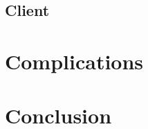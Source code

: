 \documentclass[10pt,a4paper]{article}
\begin{document}
\subsection{Client}


\section{Complications}
\label{comp}


\section{Conclusion}
\end{document}
